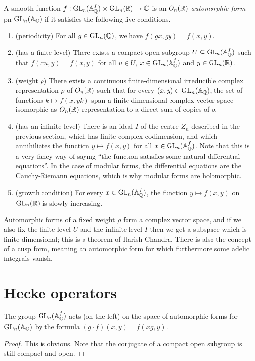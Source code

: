 \begin{definition} A smooth function $f:\operatorname{GL}_n(\mathbb{A}_{\mathbb{Q}}^f)\times\operatorname{GL}_n(\mathbb{R})\to\mathbb{C}$ is
  an $O_n(\mathbb{R})$-\emph{automorphic form} pn $\operatorname{GL}_n(\mathbb{A}_{\mathbb{Q}})$ if it satisfies the following
  five conditions.

  \begin{enumerate}
    \item (periodicity) For all $g\in\operatorname{GL}_n(\mathbb{Q})$, we have $f(gx,gy)=f(x,y)$.
    \item (has a finite level) There exists a compact open subgroup $U\subseteq\operatorname{GL}_n(\mathbb{A}_{\mathbb{Q}}^f)$
      such that $f(xu,y)=f(x,y)$ for all $u\in U$, $x\in \operatorname{GL}_n(\mathbb{A}_{\mathbb{Q}}^f)$ and $y\in\operatorname{GL}_n(\mathbb{R})$.
    \item (weight $\rho$) There exists a continuous finite-dimensional irreducible complex
    representation $\rho$ of $O_n(\mathbb{R})$ such that for every $(x,y)\in\operatorname{GL}_n(\mathbb{A}_{\mathbb{Q}})$, the
    set of functions $k\mapsto f(x,yk)$ span a finite-dimensional complex vector space isomorphic
    as $O_n(\mathbb{R})$-representation to a direct sum of copies of $\rho$.
    \item (has an infinite level) There is an ideal $I$ of the centre $Z_n$ described in the
  previous section, which has finite complex codimension, and which annihiliates the
  function $y \mapsto f(x,y)$ for all $x\in \operatorname{GL}_n(\mathbb{A}_{\mathbb{Q}}^f)$. Note that this is a very fancy
  way of saying ``the function satisfies some natural differential equations''. In the
  case of modular forms, the differential equations are the Cauchy-Riemann equations, which
  is why modular forms are holomorphic.
    \item (growth condition) For every $x\in\operatorname{GL}_n(\mathbb{A}_{\mathbb{Q}}^f)$, the function $y\mapsto f(x,y)$
  on $\operatorname{GL}_n(\mathbb{R})$ is slowly-increasing.
  \end{enumerate}

\end{definition}

Automorphic forms of a fixed weight $\rho$ form a complex vector space, and if we also
fix the finite level $U$ and the infinite level $I$ then we get a subspace which is
finite-dimensional; this is a theorem of Harish-Chandra. There is also the concept
of a cusp form, meaning an automorphic form for which furthermore some adelic integrals
vanish.

\section{Hecke operators}

\begin{lemma} The group $\operatorname{GL}_n(\mathbb{A}_{\mathbb{Q}}^f)$ acts (on the left) on the space of automorphic forms
  for $\operatorname{GL}_n(\mathbb{A}_{\mathbb{Q}})$ by the formula $(g\cdot f)(x,y)=f(xg,y)$.
\end{lemma}
\begin{proof}
  This is obvious. Note that the conjugate of a compact open subgroup is still
  compact and open.
\end{proof}

